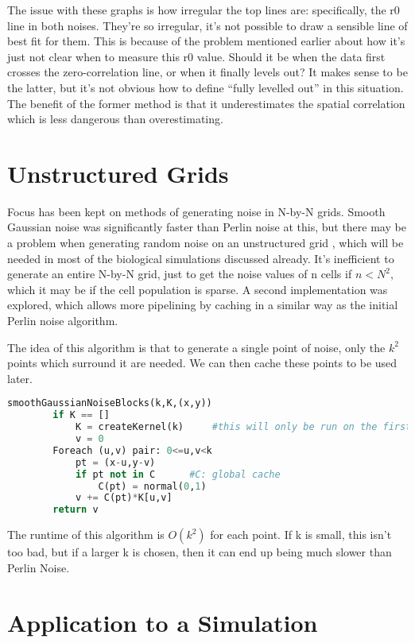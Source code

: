 \documentclass[11pt,a4paper]{article}
\begin{document}
The issue with these graphs is how irregular the top lines are: specifically, the r0 line in both noises. They’re so irregular, it’s not possible to draw a sensible line of best fit for them. This is because of the problem mentioned earlier about how it’s just not clear when to measure this r0 value. Should it be when the data first crosses the zero-correlation line, or when it finally levels out? It makes sense to be the latter, but it’s not obvious how to define “fully levelled out” in this situation. The benefit of the former method is that it underestimates the spatial correlation which is less dangerous than overestimating.

\section{Unstructured Grids}

Focus has been kept on methods of generating noise in N-by-N grids. Smooth Gaussian noise was significantly faster than Perlin noise at this, but there may be a problem when generating random noise on an unstructured grid \cite{unstruct}, which will be needed in most of the biological simulations discussed already. It’s inefficient to generate an entire N-by-N grid, just to get the noise values of n cells if $n < N^2$, which it may be if the cell population is sparse. A second implementation was explored, which allows more pipelining by caching in a similar way as the initial Perlin noise algorithm.

The idea of this algorithm is that to generate a single point of noise, only the $k^2$ points which surround it are needed. We can then cache these points to be used later.

\begin{lstlisting}[language=Python, mathescape=true]
	smoothGaussianNoiseBlocks(k,K,(x,y))
		if K == []
			K = createKernel(k) 	#this will only be run on the first point
			v = 0
		Foreach (u,v) pair: 0<=u,v<k
			pt = (x-u,y-v)
			if pt not in C		#C: global cache
				C(pt) = normal(0,1)
			v += C(pt)*K[u,v]
		return v
\end{lstlisting}

The runtime of this algorithm is $O(k^2)$ for each point. If k is small, this isn’t too bad, but if a larger k is chosen, then it can end up being much slower than Perlin Noise.

\section{Application to a Simulation}
\end{document}
